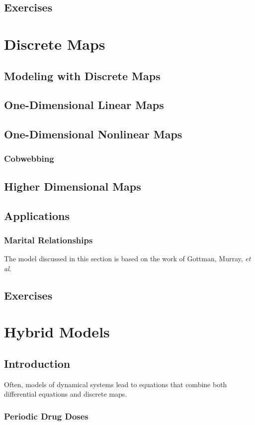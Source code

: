 \documentclass{book}
\begin{document}
\section{Exercises}

%
\chapter{Discrete Maps}
\section{Modeling with Discrete Maps}
\section{One-Dimensional Linear Maps}
\section{One-Dimensional Nonlinear Maps}
\subsection{Cobwebbing}
\section{Higher Dimensional Maps}
\section{Applications}
\subsection{Marital Relationships}
The model discussed in this section is based on the
work of Gottman, Murray, \emph{et al}\cite{GM}.
\section{Exercises}
\chapter{Hybrid Models}
\section{Introduction}
Often, models of dynamical systems lead to equations that combine
both differential equations and discrete maps.
\subsection{Periodic Drug Doses}
\end{document}

